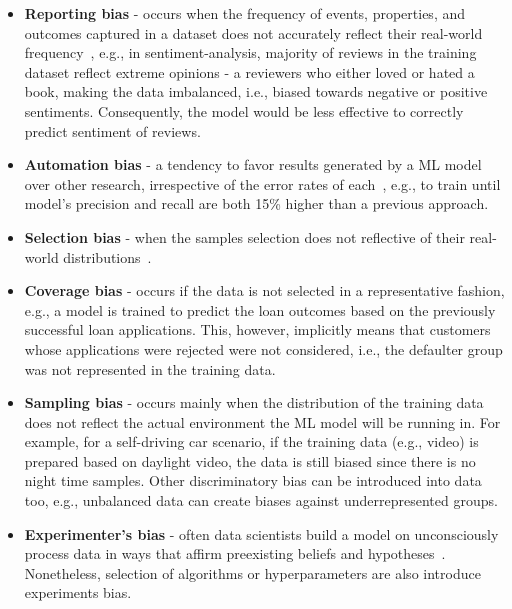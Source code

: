 \begin{itemize}[noitemsep]
    \item \textbf{Reporting bias} - occurs when the frequency of events, properties, and outcomes captured in a dataset does not accurately reflect their real-world frequency~\cite{GoogleBiasList}, e.g., in sentiment-analysis, majority of reviews in the training dataset reflect extreme opinions - a reviewers who either loved or hated a book, making the data imbalanced, i.e., biased towards negative or positive sentiments. Consequently, the model would be less effective to correctly predict sentiment of reviews. 
    \item \textbf{Automation bias} - a tendency to favor results generated by a ML model over other research, irrespective of the error rates of each~\cite{GoogleBiasList}, e.g., to train until model's precision and recall are both 15\% higher than a previous approach.
    \item \textbf{Selection bias} - when the samples selection does not reflective of their real-world distributions~\cite{GoogleBiasList}. 
    \item \textbf{Coverage bias} - occurs if the data is not selected in a representative fashion\cite{GoogleBiasList}, e.g., a model is trained to predict the loan  outcomes based on the previously successful loan applications. This, however, implicitly means that customers whose applications were rejected were not considered, i.e., the defaulter group was not represented in the training data.
    \item \textbf{Sampling bias} - occurs mainly when the distribution of the training data does not reflect the actual environment the ML model will be running in. For example, for a self-driving car scenario, if the training data (e.g., video) is prepared based on daylight video, the data is still biased since there is no night time samples. Other discriminatory bias can be introduced into data too, e.g., unbalanced data can create biases against underrepresented groups. 
    \item \textbf{Experimenter's bias} - often data scientists build a model on unconsciously process data in ways that affirm preexisting beliefs and hypotheses~\cite{GoogleBiasList}. Nonetheless, selection of algorithms or hyperparameters are also introduce experiments bias. 
\end{itemize}

